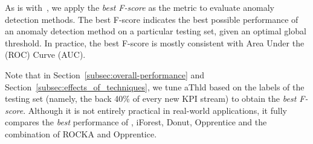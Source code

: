 

As is with~\cite{xu2018unsupervised}, we apply the \emph{best F-score} as the metric to evaluate anomaly detection methods.
The best F-score indicates the best possible performance of an anomaly detection method on a particular testing set, given an optimal global threshold. 
In practice, the best F-score is mostly consistent with Area Under the (ROC) Curve (AUC).

Note that in Section~\ref{subsec:overall-performance} and Section~\ref{subsec:effects_of_techniques}, we tune aThld based on the labels of the testing set (namely, the back 40\% of every new KPI stream) to obtain the \emph{best F-score}.
Although it is not entirely practical in real-world applications, it fully compares the \emph{best} performance of \name{}, iForest, Donut, Opprentice and the combination of ROCKA and Opprentice.

